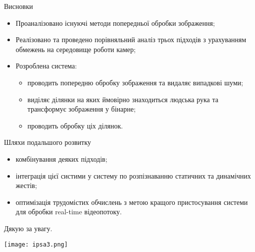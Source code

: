 \begin{frame}{Висновки}
	\manimate
	\begin{itemize}
		\item Проаналізовано існуючі методи попередньої обробки зображення;
		\item Реалізовано та проведено порівняльний аналіз трьох підходів з урахуванням обмежень на середовище роботи камер;
		\item Розроблена система:
		\begin{itemize}
			\item проводить попередню обробку зображення та видаляє випадкові шуми;
			\item виділяє ділянки на яких ймовірно знаходиться людська рука та трансформує зображення у бінарне;
			\item проводить обробку ціх ділянок.
		\end{itemize}
	\end{itemize}
\end{frame}

\begin{frame}{Шляхи подальшого розвитку}
	\manimate
	\begin{itemize}
		\item комбінування деяких підходів;
		\item інтеграція цієї систими у систему по розпізнаванню статичних та динамічних жестів;
		\item оптимізація трудомістих обчислень з метою кращого пристосування системи для обробки real-time відеопотоку.
	\end{itemize}
\end{frame}


\begin{frame}
	\manimate
	\centering
	\Large Дякую за увагу.
	
	\begin{center}
		\texttt{[image: ipsa3.png]}
	\end{center}
\end{frame}